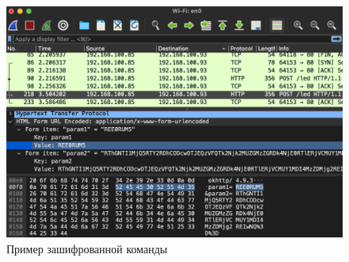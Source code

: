 	\begin{figure}[h]
		\centering
		\includegraphics[scale=0.6]{resources/wireshark-encryption-enabled}
		\caption{Пример зашифрованной команды}
		\label{fig4.8}
	\end{figure}
	